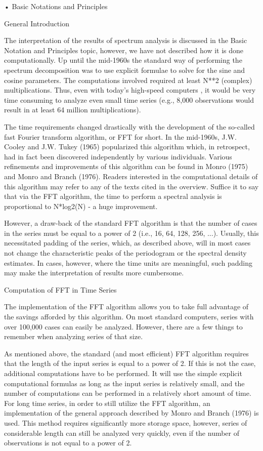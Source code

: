 •
Basic Notations and Principles



General Introduction

The interpretation of the results of spectrum analysis is discussed in the Basic Notation and Principles topic, however, we have not described how it is done computationally. Up until the mid-1960s the standard way of performing the spectrum decomposition was to use explicit formulae to solve for the sine and cosine parameters. The computations involved required at least N**2 (complex) multiplications. Thus, even with today's high-speed computers , it would be very time consuming to analyze even small time series (e.g., 8,000 observations would result in at least 64 million multiplications).

The time requirements changed drastically with the development of the so-called fast Fourier transform algorithm, or FFT for short. In the mid-1960s, J.W. Cooley and J.W. Tukey (1965) popularized this algorithm which, in retrospect, had in fact been discovered independently by various individuals. Various refinements and improvements of this algorithm can be found in Monro (1975) and Monro and Branch (1976). Readers interested in the computational details of this algorithm may refer to any of the texts cited in the overview. Suffice it to say that via the FFT algorithm, the time to perform a spectral analysis is proportional to N*log2(N) - a huge improvement.

However, a draw-back of the standard FFT algorithm is that the number of cases in the series must be equal to a power of 2 (i.e., 16, 64, 128, 256, ...). Usually, this necessitated padding of the series, which, as described above, will in most cases not change the characteristic peaks of the periodogram or the spectral density estimates. In cases, however, where the time units are meaningful, such padding may make the interpretation of results more cumbersome.

Computation of FFT in Time Series

The implementation of the FFT algorithm allows you to take full advantage of the savings afforded by this algorithm. On most standard computers, series with over 100,000 cases can easily be analyzed. However, there are a few things to remember when analyzing series of that size.

As mentioned above, the standard (and most efficient) FFT algorithm requires that the length of the input series is equal to a power of 2. If this is not the case, additional computations have to be performed. It will use the simple explicit computational formulas as long as the input series is relatively small, and the number of computations can be performed in a relatively short amount of time. For long time series, in order to still utilize the FFT algorithm, an implementation of the general approach described by Monro and Branch (1976) is used. This method requires significantly more storage space, however, series of considerable length can still be analyzed very quickly, even if the number of observations is not equal to a power of 2.

